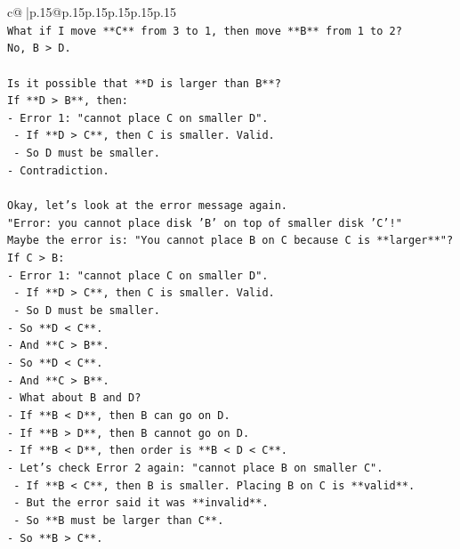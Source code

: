 \documentclass{article}
\begin{document}
{\begin{supertabular}{c@{$\;$}|p{.15\linewidth}@{}p{.15\linewidth}p{.15\linewidth}p{.15\linewidth}p{.15\linewidth}p{.15\linewidth}}
{{{\\ 
\texttt{What if I move **C** from 3 to 1, then move **B** from 1 to 2?} \\
\texttt{No, B > D.} \\
\\ 
\texttt{Is it possible that **D is larger than B**?} \\
\texttt{If **D > B**, then:} \\
\texttt{{-} Error 1: "cannot place C on smaller D".} \\
\texttt{    {-} If **D > C**, then C is smaller. Valid.} \\
\texttt{    {-} So D must be smaller.} \\
\texttt{{-} Contradiction.} \\
\\ 
\texttt{Okay, let's look at the error message again.} \\
\texttt{"Error: you cannot place disk 'B' on top of smaller disk 'C'!"} \\
\texttt{Maybe the error is: "You cannot place B on C because C is **larger**"?} \\
\texttt{If C > B:} \\
\texttt{{-} Error 1: "cannot place C on smaller D".} \\
\texttt{    {-} If **D > C**, then C is smaller. Valid.} \\
\texttt{    {-} So D must be smaller.} \\
\texttt{{-} So **D < C**.} \\
\texttt{{-} And **C > B**.} \\
\texttt{{-} So **D < C**.} \\
\texttt{{-} And **C > B**.} \\
\texttt{{-} What about B and D?} \\
\texttt{{-} If **B < D**, then B can go on D.} \\
\texttt{{-} If **B > D**, then B cannot go on D.} \\
\texttt{{-} If **B < D**, then order is **B < D < C**.} \\
\texttt{{-} Let's check Error 2 again: "cannot place B on smaller C".} \\
\texttt{    {-} If **B < C**, then B is smaller. Placing B on C is **valid**.} \\
\texttt{    {-} But the error said it was **invalid**.} \\
\texttt{    {-} So **B must be larger than C**.} \\
\texttt{{-} So **B > C**.} \\
}}}
\end{supertabular}}
\end{document}
